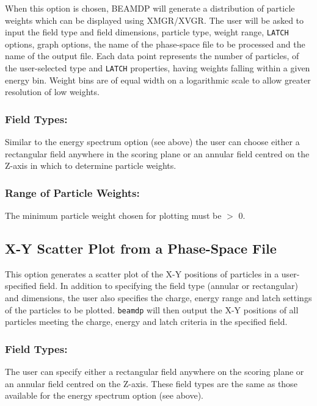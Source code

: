\documentclass[12pt,twoside]{article}
\begin{document}
When this option is chosen, BEAMDP will generate a distribution of
particle weights which can be displayed using XMGR/XVGR.  The user
will be asked to input the
field type and field dimensions, particle type,
weight range, \verb+LATCH+ options, graph options,
the name of the phase-space file to be processed and the name of the output
file.  Each data point represents the number of particles, of the user-selected
type and \verb+LATCH+ properties, having weights
falling within a given energy bin.  Weight bins are of equal width on
a logarithmic scale to allow greater resolution of low weights.

\subsubsection{Field Types:}

Similar to the energy spectrum option (see above) the user can choose
either a rectangular field anywhere in the scoring plane or an annular field
centred on the Z-axis in which to determine particle weights.

\subsubsection{ Range of Particle Weights:}

The minimum particle weight chosen for plotting must be $>$ 0.

\subsection{X-Y Scatter Plot from a Phase-Space File}

This option generates a scatter plot of the X-Y positions of particles
in a user-specified field.  In addition to specifying the field type
(annular or rectangular) and dimensions, the user also specifies the
charge, energy range and latch settings of the particles to be plotted.
{\tt beamdp} will then output the X-Y positions of all particles meeting
the charge, energy and latch criteria in the specified field.

\subsubsection{Field Types:}

The user can specify either a rectangular field anywhere on the scoring plane or
an annular field centred on the Z-axis.  These field types are the same as
those available for the energy spectrum option (see above).
\end{document}
